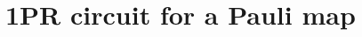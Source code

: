 \documentclass[10pt,letterpaper]{article} %
\begin{document}
 
\newpage
\section{1PR circuit for a Pauli map} %
\label{sec: 1PR circuit for a Pauli map}
\end{document}
